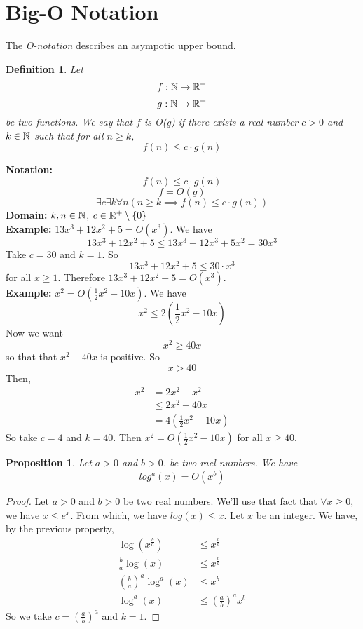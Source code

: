 \documentclass[openany]{report}
\newtheorem{definition}{Definition}[section]
\newtheorem{prop}{Proposition}[section]
\begin{document}
\section{Big-O Notation}
The \emph{O-notation} describes an asympotic upper bound.
\begin{definition}
    Let 
    \[f: \mathbb{N} \rightarrow \mathbb{R}^+\]
    \[g: \mathbb{N} \rightarrow \mathbb{R}^+\]
    be two functions. We say that $f$ is \emph{O(g)} if there exists a real number $c > 0$ and $k \in \mathbb{N}$ such that for all $n \geq k$, 
    \[f(n) \leq c \cdot g(n)\]
\end{definition} 
\noindent
\textbf{Notation:}
\[f(n) \leq c \cdot g(n)\]
\[f = O(g)\]
\[\exists c\exists k \forall n (n \geq k \implies f(n) \leq c \cdot g(n))\]
\textbf{Domain:} $k, n \in \mathbb{N}$, $c \in \mathbb{R}^+ \setminus \{0\}$\\[3ex]
\noindent
\textbf{Example:} $13x^3 + 12x^2 + 5 = O(x^3)$. We have
\[13x^3 + 12x^2 + 5 \leq 13x^3 + 12x^3 + 5x^2 = 30x^3\]
Take $c = 30$ and $k = 1$. So 
\[13x^3 + 12x^2 + 5 \leq 30 \cdot x^3 \]
for all $x \geq 1$. Therefore $13x^3 + 12x^2 + 5 = O(x^3)$. \\[3ex]
\textbf{Example:} $x^2 = O\left(\frac{1}{2}x^2 - 10x\right)$. We have 
\[x^2 \leq 2 \left(\frac{1}{2}x^2 - 10x\right)\]
Now we want 
\[x^2 \geq 40x\]
so that that $x^2 - 40x$ is positive. So
\[x > 40\]
Then, 
\begin{align*}
    x^2 &= 2x^2 - x^2\\
    &\leq 2x^2 - 40x\\
    &= 4\left(\frac{1}{2}x^2 - 10x\right)
\end{align*}
So take $c = 4$ and $k = 40$. Then $x^2 = O\left(\frac{1}{2}x^2 - 10x\right)$ for all $x \geq 40$.


\begin{prop}
    Let $a > 0$ and $b > 0$. be two rael numbers. We have 
    \[log^a(x) = O(x^b)\]
\end{prop}
\begin{proof}
    Let $a > 0$ and $b > 0$ be two real numbers. We'll use that fact that $\forall x \geq 0$, we have $x \leq e^x$. From which, we have $log(x) \leq x$. Let $x$ be an integer. We have, by the previous property, 
    \begin{align*}
        \log(x^{\frac{b}{a}}) &\leq x^{\frac{b}{a}}\\
        \frac{b}{a}\log(x) &\leq x^{\frac{b}{a}}\\
        \left(\frac{b}{a}\right)^a \log^a(x) &\leq x^b\\
        \log^a(x) &\leq \left(\frac{a}{b}\right)^ax^b
    \end{align*}
    So we take $c = \left(\frac{a}{b}\right)^a$ and $k = 1$.
\end{proof}
\end{document}
